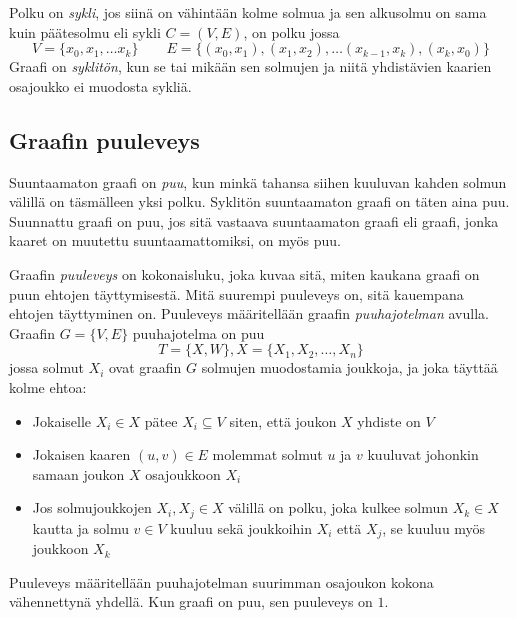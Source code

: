 \begin{center} 
\centering 
\begin{minipage}{.5\textwidth} 
  \centering 
\end{minipage}%
\begin{minipage}{.5\textwidth} 
  \centering 
\end{minipage} 
\end{center} 

Polku on \emph{sykli}, jos siinä on vähintään kolme solmua ja sen alkusolmu on sama kuin päätesolmu eli sykli $C = (V, E)$, on polku jossa 
$$ 
    V = \{x_0, x_1, \ldots x_k \} \qquad E = \{(x_0, x_1), (x_1,x_2),\ldots(x_{k-1}, x_k), (x_k, x_0)\} 
$$ 
Graafi on \emph{syklitön}, kun se tai mikään sen solmujen ja niitä yhdistävien kaarien osajoukko ei muodosta sykliä. 

\subsection{Graafin puuleveys}\label{puuleveys} 

Suuntaamaton graafi on \emph{puu}, kun minkä tahansa siihen kuuluvan kahden solmun välillä on täsmälleen yksi polku. Syklitön suuntaamaton graafi on täten aina puu. Suunnattu graafi on puu, jos sitä vastaava suuntaamaton graafi eli graafi, jonka kaaret on muutettu suuntaamattomiksi, on myös puu. 

Graafin \emph{puuleveys} \citep{robertson_graph_1984} on kokonaisluku, joka kuvaa sitä, miten kaukana graafi on puun ehtojen täyttymisestä. Mitä suurempi puuleveys on, sitä kauempana ehtojen täyttyminen on. Puuleveys määritellään graafin \emph{puuhajotelman} avulla. Graafin $G = \{ V,E \}$ puuhajotelma on puu  
$$     
    T = \{X, W\}, X = \{X_1, X_2, \ldots , X_n\} 
$$ 
jossa solmut $X_i$ ovat graafin $G$ solmujen muodostamia joukkoja, ja joka täyttää kolme ehtoa: 
\begin{itemize} 

    \item Jokaiselle $X_i \in X$ pätee $X_i \subseteq V$ siten, että joukon $X$ yhdiste on $V$ \\   

    \item Jokaisen kaaren $( u, v ) \in E$ molemmat solmut $u$ ja $v$ kuuluvat johonkin samaan joukon $X$ osajoukkoon $X_i$ \\ 

    \item Jos solmujoukkojen $X_i, X_j \in X$ välillä on polku, joka kulkee solmun $X_k \in X$ kautta ja solmu $v \in V$ kuuluu sekä joukkoihin $X_i$ että $X_j$, se kuuluu myös joukkoon $X_k$ 

\end{itemize} 
Puuleveys määritellään puuhajotelman suurimman osajoukon kokona vähennettynä yhdellä. Kun graafi on puu, sen puuleveys on $1$. 

